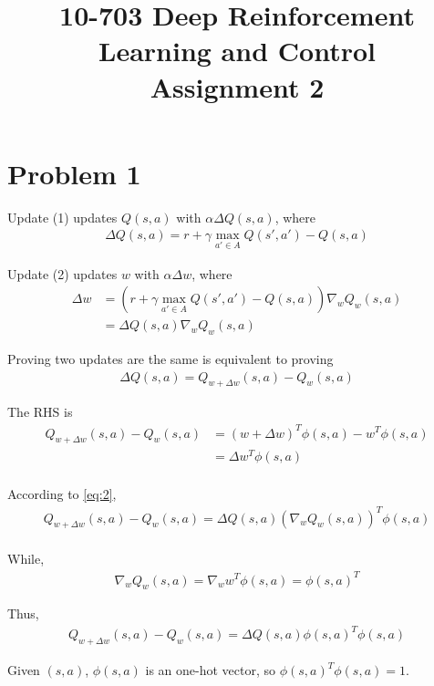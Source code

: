 \documentclass{article}
\title{10-703 Deep Reinforcement Learning and Control \\ Assignment 2 \\}
\date{}
\begin{document}
\maketitle

\section*{Problem 1}

Update (1) updates $Q(s,a)$ with $\alpha \Delta Q(s,a)$, where
\begin{align}
  \label{eq:1}
  \Delta Q(s,a) = r + \gamma \max_{a' \in A} Q(s', a') - Q(s,a)
\end{align}

Update (2) updates $w$ with $\alpha \Delta w$, where
\begin{align}
  \label{eq:2}
  \Delta w &= (r + \gamma \max_{a' \in A} Q(s', a') - Q(s,a)) \nabla_{w} Q_{w}(s,a) \\
           &= \Delta Q(s,a) \nabla_{w} Q_{w}(s,a) 
\end{align}

Proving two updates are the same is equivalent to proving
\begin{align}
  \label{eq:3}
  \Delta Q(s,a) = Q_{w+\Delta w}(s,a) - Q_{w}(s,a) 
\end{align}

The RHS is 
\begin{align}
  \label{eq:4}
  Q_{w+\Delta w}(s,a) - Q_{w}(s,a) &= (w + \Delta w)^{T} \phi(s,a) - w^{T} \phi(s,a) \\
                                   &= \Delta w^{T} \phi(s,a) \\
\end{align}

According to \eqref{eq:2},
\begin{align}
  \label{eq:5}
  Q_{w+\Delta w}(s,a) - Q_{w}(s,a) = \Delta Q(s,a) (\nabla_{w} Q_{w}(s,a))^{T} \phi(s,a)\\
\end{align}

While,
\begin{align}
  \label{eq:6}
  \nabla_{w} Q_{w}(s,a) = \nabla_{w} w^{T}\phi(s,a) = \phi(s,a)^{T}
\end{align}

Thus,
\begin{align}
  \label{eq:7}
  Q_{w+\Delta w}(s,a) - Q_{w}(s,a) = \Delta Q(s,a) \phi(s,a)^{T} \phi(s,a)
\end{align}

Given $(s,a)$, $\phi(s,a)$ is an one-hot vector, so $\phi(s,a)^{T} \phi(s,a) = 1$.
\end{document}
